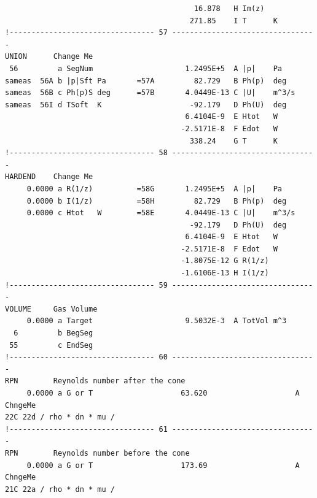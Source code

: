 \begin{linenumbers}
\begin{verbatim}
                                           16.878   H Im(z)
                                          271.85    I T      K
!--------------------------------- 57 ---------------------------------
UNION      Change Me
 56         a SegNum                     1.2495E+5  A |p|    Pa
sameas  56A b |p|Sft Pa       =57A         82.729   B Ph(p)  deg
sameas  56B c Ph(p)S deg      =57B       4.0449E-13 C |U|    m^3/s
sameas  56I d TSoft  K                    -92.179   D Ph(U)  deg
                                         6.4104E-9  E Htot   W
                                        -2.5171E-8  F Edot   W
                                          338.24    G T      K
!--------------------------------- 58 ---------------------------------
HARDEND    Change Me
     0.0000 a R(1/z)          =58G       1.2495E+5  A |p|    Pa
     0.0000 b I(1/z)          =58H         82.729   B Ph(p)  deg
     0.0000 c Htot   W        =58E       4.0449E-13 C |U|    m^3/s
                                          -92.179   D Ph(U)  deg
                                         6.4104E-9  E Htot   W
                                        -2.5171E-8  F Edot   W
                                        -1.8075E-12 G R(1/z)
                                        -1.6106E-13 H I(1/z)
!--------------------------------- 59 ---------------------------------
VOLUME     Gas Volume
     0.0000 a Target                     9.5032E-3  A TotVol m^3
  6         b BegSeg                    
 55         c EndSeg                    
!--------------------------------- 60 ---------------------------------
RPN        Reynolds number after the cone
     0.0000 a G or T                    63.620                    A ChngeMe
22C 22d / rho * dn * mu /
!--------------------------------- 61 ---------------------------------
RPN        Reynolds number before the cone
     0.0000 a G or T                    173.69                    A ChngeMe
21C 22a / rho * dn * mu /
\end{verbatim}
\end{linenumbers}